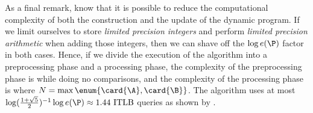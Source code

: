 
As a final remark, know that it is possible to reduce the computational
complexity of both the construction and the update of the dynamic program. If
we limit ourselves to store \emph{limited precision integers} and perform
\emph{limited precision arithmetic} when adding those integers, then we can
shave off the \(\log e(\P)\) factor in both cases. Hence, if we divide the
execution of the algorithm into a preprocessing phase and a processing phase,
the complexity of the preprocessing phase is \BigO{\card{\A}\card{\B}} while doing no
comparisons, and the complexity of the processing phase is 
where \(N = \max \enum{\card{\A},\card{\B}}\). The algorithm uses at most
\(\log(\frac{1+\sqrt{5}}{2})^{-1} \log e(\P) \approx 1.44 \text{ ITLB}\)
queries as shown by \citet*{linial:1984}.
